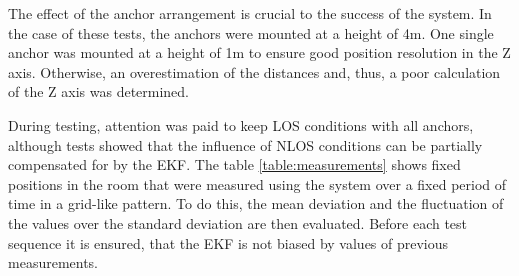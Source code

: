 \documentclass[conference, a4paper]{IEEEtran}
\begin{document}
The effect of the anchor arrangement is crucial to the success of the system.
In the case of these tests, the anchors were mounted at a height of 4m.
One single anchor was mounted at a height of 1m to ensure good position resolution in the Z axis.
Otherwise, an overestimation of the distances and, thus, a poor calculation of the Z axis was determined.

During testing, attention was paid to keep \ac{LOS} conditions with all anchors,
although tests showed that the influence of \ac{NLOS} conditions can be partially compensated for by the \ac{EKF}.
The table \ref{table:measurements} shows fixed positions in the room that were measured using the system
over a fixed period of time in a grid-like pattern. 
To do this, the mean deviation and the fluctuation of the values over the standard deviation are then evaluated. 
Before each test sequence it is ensured, that the \ac{EKF} is not biased by values of previous measurements. 
\end{document}

